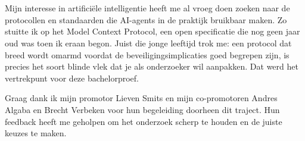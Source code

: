 
\chapter*{}%
\label{ch:voorwoord}

Mijn interesse in artificiële intelligentie heeft me al vroeg doen zoeken naar de protocollen en standaarden die AI-agents in de praktijk bruikbaar maken. Zo stuitte ik op het Model Context Protocol, een open specificatie die nog geen jaar oud was toen ik eraan begon. Juist die jonge leeftijd trok me: een protocol dat breed wordt omarmd voordat de beveiligingsimplicaties goed begrepen zijn, is precies het soort blinde vlek dat je als onderzoeker wil aanpakken. Dat werd het vertrekpunt voor deze bachelorproef.

Graag dank ik mijn promotor Lieven Smits en mijn co-promotoren Andres Algaba en Brecht Verbeken voor hun begeleiding doorheen dit traject. Hun feedback heeft me geholpen om het onderzoek scherp te houden en de juiste keuzes te maken.